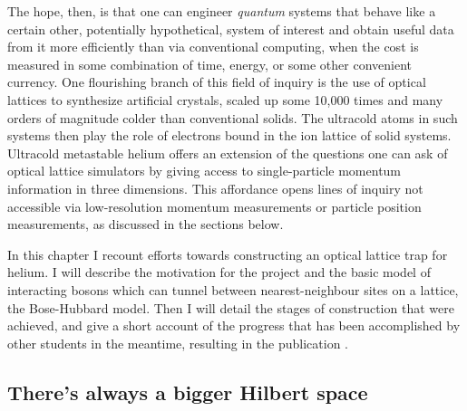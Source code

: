 	The hope, then, is that one can engineer \emph{quantum} systems that behave like a certain other, potentially hypothetical, system of interest and obtain useful data from it more efficiently than via conventional computing, when the cost is measured in some combination of time, energy, or some other convenient currency.
	One flourishing branch of this field of inquiry is the use of {optical lattices} to synthesize artificial crystals, scaled up some 10,000 times and many orders of magnitude colder than conventional solids.
	The ultracold atoms in such systems then play the role of electrons bound in the ion lattice of solid systems.
	Ultracold metastable helium offers an extension of the questions one can ask of optical lattice simulators by giving access to single-particle momentum information in three dimensions.
	This affordance opens lines of inquiry not accessible via low-resolution momentum measurements or particle position measurements, as discussed in the sections below.

	In this chapter I recount efforts towards constructing an optical lattice trap for helium.
	I will describe the motivation for the project and the basic model of interacting bosons which can tunnel between nearest-neighbour sites on a lattice, the Bose-Hubbard model.
	Then I will detail the stages of construction that were achieved, and give a short account of the progress that has been accomplished by other students in the meantime, resulting in the publication \cite{Abbas21}.
	
	

\subsection{There's always a bigger Hilbert space}


